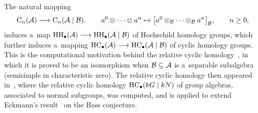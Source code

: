 \documentclass[pdftex]{sigma}
\numberwithin{equation}{section}
\begin{document}
The natural mapping
\begin{gather*}
{\rm C}_n({\cal A})\longrightarrow {\rm C}_n({\cal A}\mid{\cal B}),
\qquad
a^0\otimes\dots\otimes a^n\mapsto \big[a^0\otimes_{\cal B} \dots \otimes_{\cal B} a^n\big]_{{\cal B}},
\qquad
n\geq 0,
\end{gather*}
induces a~map ${\rm HH}_\bullet({\cal A})\longrightarrow {\rm HH}_\bullet({\cal A}\mid{\cal B})$ of Hochschild homology
groups, which further induces a~mapping ${\rm HC}_\bullet({\cal A})\longrightarrow {\rm HC}_\bullet({\cal A}\mid{\cal
B})$ of cyclic homology groups.
This is the computational motivation behind the relative cyclic homology~\cite{Kadi92}, in which it is proved to be an
isomorphism when ${\cal B}\subseteq {\cal A}$ is a~separable subalgebra (semisimple in characteristic zero).
The relative cyclic homology then appeared in~\cite{Scha92}, where the relative cyclic homology ${\rm HC}_\bullet(kG\mid kN)$
of group algebras, associated to normal subgroups, was computed, and is applied to extend Eckmann's
result~\cite{Eckm86} on the Bass conjecture.
\end{document}
